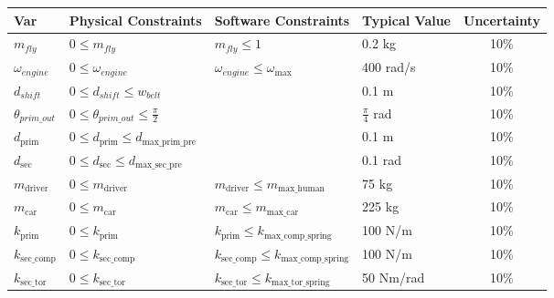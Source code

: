 \documentclass[12pt]{article}
\begin{document}
\begin{table}[H]
  \caption{Input Variables} \label{TblInputVar}
  \renewcommand{\arraystretch}{1.2}
\noindent \begin{longtable*}{l l l l c} 
  \toprule
  \textbf{Var} & \textbf{Physical Constraints} & \textbf{Software Constraints} &
                             \textbf{Typical Value} & \textbf{Uncertainty}\\
  \midrule 
  $m_{fly}$ & $0 \leq m_{fly}$ & $m_{fly} \leq 1$ & 0.2 kg & 10\%\\
  $\omega_{engine}$ & $0 \leq \omega_{engine}$ & $\omega_{engine} \leq \omega_\text{max}$ & 400 rad/s & 10\%\\
  $d_{shift}$ & $0 \leq d_{shift} \leq w_{belt}$ & & 0.1 m & 10\%\\
  $\theta_{prim\_out}$ & $0 \leq \theta_{prim\_out} \leq \frac{\pi}{2}$ & & $\frac{\pi}{4}$ rad & 10\%\\
  $d_{\text{prim}}$ & $0 \leq d_{\text{prim}} \leq d_\text{max\_prim\_pre}$ & & 0.1 m & 10\%\\
  $d_{\text{sec}}$ & $0 \leq d_{\text{sec}} \leq d_\text{max\_sec\_pre}$ & & 0.1 rad & 10\%\\
  $m_{\text{driver}}$ & $0 \leq m_{\text{driver}}$ & $ m_{\text{driver}} \leq m_\text{max\_human}$ & 75 kg & 10\%\\
  $m_{\text{car}}$ & $0 \leq m_{\text{car}}$ & $m_{\text{car}} \leq m_\text{max\_car}$ & 225 kg & 10\%\\
  $k_{\text{prim}}$ & $0 \leq k_{\text{prim}}$ & $k_{\text{prim}} \leq k_\text{max\_comp\_spring}$ & 100 N/m & 10\%\\
  $k_{\text{sec\_comp}}$ & $0 \leq k_{\text{sec\_comp}}$ & $k_{\text{sec\_comp}} \leq k_\text{max\_comp\_spring}$ & 100 N/m & 10\%\\
  $k_{\text{sec\_tor}}$ & $0 \leq k_{\text{sec\_tor}}$ & $k_{\text{sec\_tor}} \leq k_\text{max\_tor\_spring}$ & 50 Nm/rad & 10\%\\
  \bottomrule
\end{longtable*}
\end{table}

\noindent
\end{document}
